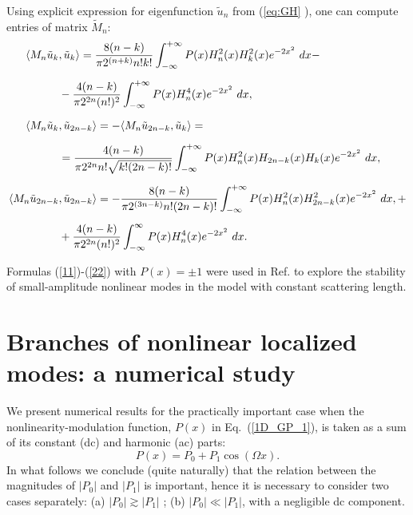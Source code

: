 \documentclass[aps,preprint,showkeys,
]{revtex4}
\begin{document}
Using explicit expression for eigenfunction $\tilde{u}_{n}$ from (\ref{eq:GH}%
), one can compute entries of matrix $\tilde{M}_{n}$: %
\begin{align}
\langle M_{n}\tilde{u}_{k}& ,\tilde{u}_{k}\rangle =\frac{8(n-k)}{\pi
2^{(n+k)}n!k!}\int_{-\infty }^{+\infty
}P(x)H_{n}^{2}(x)H_{k}^{2}(x)e^{-2x^{2}}~dx-  \notag \\[2mm]
& -\frac{4(n-k)}{\pi 2^{2n}(n!)^{2}}\int_{-\infty }^{+\infty
}P(x)H_{n}^{4}(x)e^{-2x^{2}}~dx,  \label{11} \\[2mm]
\langle M_{n}\tilde{u}_{k}& ,\tilde{u}_{2n-k}\rangle =-\langle M_{n}\tilde{u}%
_{2n-k},\tilde{u}_{k}\rangle =  \notag \\[2mm]
& =\frac{4(n-k)}{\pi 2^{2n}n!\sqrt{k!(2n-k)!}}\int_{-\infty }^{+\infty
}P(x)H_{n}^{2}(x)H_{2n-k}(x)H_{k}(x)e^{-2x^{2}}~dx,  \label{12} \\[2mm]
\langle M_{n}\tilde{u}_{2n-k}& ,\tilde{u}_{2n-k}\rangle =-\frac{8(n-k)}{\pi
2^{(3n-k)}n!(2n-k)!}\int_{-\infty }^{+\infty
}P(x)H_{n}^{2}(x)H_{2n-k}^{2}(x)e^{-2x^{2}}~dx,+  \notag \\[2mm]
& +\frac{4(n-k)}{\pi 2^{2n}(n!)^{2}}\int_{-\infty }^{\infty
}P(x)H_{n}^{4}(x)e^{-2x^{2}}~dx.  \label{22}
\end{align}

Formulas (\ref{11})-(\ref{22}) with $P(x)=\pm 1$ were used in Ref. \cite%
{ZAKP08} to explore the stability of small-amplitude nonlinear modes %
in the model with constant scattering length.

\section{Branches of nonlinear localized modes: a numerical study}

\label{NLM:general}

We present numerical results for the practically important case when the
nonlinearity-modulation function, $P(x)$ in Eq.~(\ref{1D_GP_1}), is taken as
a sum of its constant (dc) and harmonic (ac) parts:
\begin{equation}
P(x)=P_{0}+P_{1}\cos \left( \Omega x\right) .  \label{TwoH_App}
\end{equation}%
In what follows we conclude (quite naturally) that the relation between the
magnitudes of $|P_{0}|$ and $|P_{1}|$ is important, hence it is necessary to
consider two cases separately: (a) $|P_{0}|\gtrsim |P_{1}|$ ; (b) $%
|P_{0}|\ll |P_{1}|$, with a negligible dc component.
\end{document}
